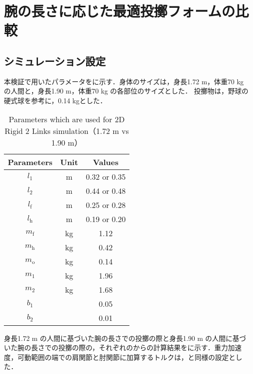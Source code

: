 \clearpage
\section{腕の長さに応じた最適投擲フォームの比較}
\subsection{シミュレーション設定}
本検証で用いたパラメータをに示す．身体のサイズは，身長1.72 m，体重70 kgの人間と，身長1.90 m，体重70 kg の各部位のサイズとした．
投擲物は，野球の硬式球を参考に，0.14 kgとした．
\begin{table}[tb]
  \begin{center}
    \caption{Parameters which are used for 2D Rigid 2 Links simulation（1.72 m vs 1.90 m）}
    \begin{tabular}{c|c|c}
      \hline
      Parameters & Unit & Values \\
      \hline
      $l_{1}$ & m & 0.32 or 0.35 \\
      $l_{2}$ & m & 0.44 or 0.48 \\
      $l_{\mathrm{f}}$ & m & 0.25 or 0.28 \\
      $l_{\mathrm{h}}$ & m & 0.19 or 0.20 \\
      $m_{\mathrm{f}}$ & kg & 1.12 \\
      $m_{\mathrm{h}}$ & kg & 0.42 \\
      $m_{\mathrm{o}}$ & kg & 0.14 \\
      $m_{1}$ & kg & 1.96 \\
      $m_{2}$ & kg & 1.68 \\
      $b_{1}$ &  & 0.05 \\
      $b_{2}$ &  & 0.01 \\
      \hline
    \end{tabular}
  \end{center}
\end{table}


身長1.72 m の人間に基づいた腕の長さでの投擲の際と身長1.90 m の人間に基づいた腕の長さでの投擲の際の，それぞれのからの計算結果をに示す．重力加速度，可動範囲の端での肩関節と肘関節に加算するトルクは，と同様の設定とした．


